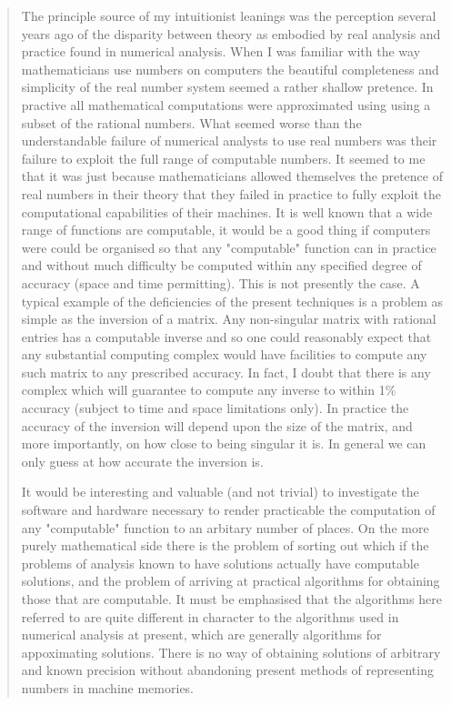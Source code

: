\documentclass[10pt,titlepage]{book}
\begin{document}
\begin{quote}
The principle source of my intuitionist leanings was the perception several years ago of the disparity between theory as embodied by real analysis and practice found in numerical analysis. When I was familiar with the way mathematicians use numbers on computers the beautiful completeness and simplicity of the real number system seemed a rather shallow pretence. In practive all mathematical computations were approximated using using a subset of the rational numbers. What seemed worse than the understandable failure of numerical analysts to use real numbers was their failure to exploit the full range of computable numbers. It seemed to me that it was just because mathematicians allowed themselves the pretence of real numbers in their theory that they failed in practice to fully exploit the computational capabilities of their machines. It is well known that a wide range of functions are computable, it would be a good thing if computers were could be organised so that any "computable" function can in practice and without much difficulty be computed within any specified degree of accuracy (space and time permitting). This is not presently the case. A typical example of the deficiencies of the present techniques is a problem as simple as the inversion of a matrix. Any non-singular matrix with rational entries has a computable inverse and so one could reasonably expect that any substantial computing complex would have facilities to compute any such matrix to any prescribed accuracy. In fact, I doubt that there is any complex which will guarantee to compute any inverse to within 1\% accuracy (subject to time and space limitations only). In practice the accuracy of the inversion will depend upon the size of the matrix, and more importantly, on how close to being singular it is. In general we can only guess at how accurate the inversion is.

It would be interesting and valuable (and not trivial) to investigate the software and hardware necessary to render practicable the computation of any "computable" function to an arbitary number of places. On the more purely mathematical side there is the problem of sorting out which if the problems of analysis known to have solutions actually have computable solutions, and the problem of arriving at practical algorithms for obtaining those that are computable. It must be emphasised that the algorithms here referred to are quite different in character to the algorithms used in numerical analysis at present, which are generally algorithms for appoximating solutions. There is no way of obtaining solutions of arbitrary and known precision without abandoning present methods of representing numbers in machine memories.
\end{quote}
\end{document}

